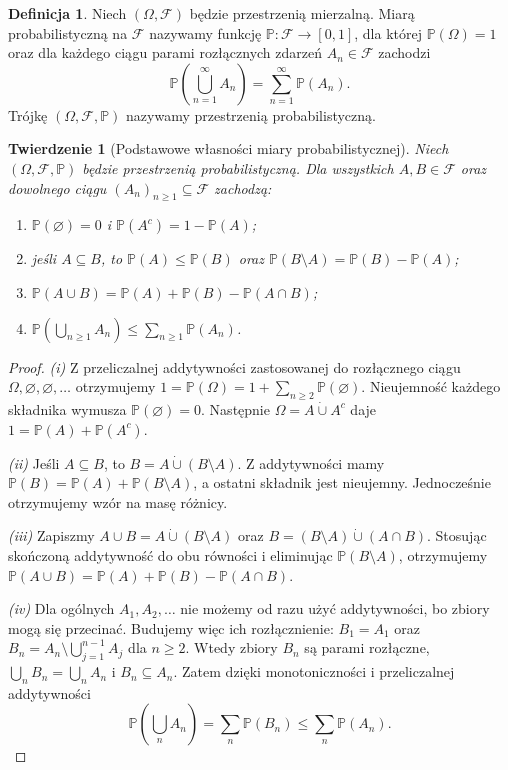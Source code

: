 \documentclass[11pt,a4paper,oneside]{report}
\numberwithin{equation}{chapter}
\theoremstyle{plain}
\newtheorem{twierdzenie}{Twierdzenie}[chapter]
\theoremstyle{definition}
\newtheorem{definicja}{Definicja}[chapter]
\theoremstyle{remark}
\newcommand{\Prob}{\mathbb{P}}
\begin{document}
\begin{definicja}
Niech $(\Omega,\mathcal F)$ będzie przestrzenią mierzalną.
Miarą probabilistyczną na $\mathcal F$ nazywamy funkcję
$\Prob:\mathcal F\to[0,1]$, dla której $\Prob(\Omega)=1$
oraz dla każdego ciągu parami rozłącznych zdarzeń $A_n\in\mathcal F$
zachodzi
\begin{equation}\label{eq:sigma_add}
\Prob\!\left(\bigcup_{n=1}^\infty A_n\right)
=\sum_{n=1}^\infty\Prob(A_n).
\end{equation}
Trójkę $(\Omega,\mathcal F,\Prob)$ nazywamy przestrzenią probabilistyczną.
\end{definicja}

\begin{twierdzenie}[Podstawowe własności miary probabilistycznej]
Niech $(\Omega,\mathcal F,\Prob)$ będzie przestrzenią probabilistyczną.
Dla wszystkich $A,B\in\mathcal F$ oraz dowolnego ciągu
$(A_n)_{n\geq1}\subseteq\mathcal F$ zachodzą:
\begin{enumerate}[label=(\roman*)]
\item $\Prob(\varnothing)=0$ i $\Prob(A^c)=1-\Prob(A)$;
\item jeśli $A\subseteq B$, to $\Prob(A)\leq\Prob(B)$ oraz
      $\Prob(B\setminus A)=\Prob(B)-\Prob(A)$;
\item $\Prob(A\cup B)=\Prob(A)+\Prob(B)-\Prob(A\cap B)$;
\item $\Prob(\bigcup_{n\geq1}A_n)\leq\sum_{n\geq1}\Prob(A_n)$.
\end{enumerate}
\end{twierdzenie}
\begin{proof}
\emph{(i)} Z przeliczalnej addytywności zastosowanej do
rozłącznego ciągu $\Omega,\varnothing,\varnothing,\ldots$
otrzymujemy
$1=\Prob(\Omega)=1+\sum_{n\geq2}\Prob(\varnothing)$.
Nieujemność każdego składnika wymusza
$\Prob(\varnothing)=0$. Następnie
$\Omega=A\mathbin{\dot\cup}A^c$ daje
$1=\Prob(A)+\Prob(A^c)$.

\emph{(ii)} Jeśli $A\subseteq B$, to
$B=A\mathbin{\dot\cup}(B\setminus A)$.
Z addytywności mamy
$\Prob(B)=\Prob(A)+\Prob(B\setminus A)$, a ostatni
składnik jest nieujemny. Jednocześnie otrzymujemy wzór
na masę różnicy.

\emph{(iii)} Zapiszmy
$A\cup B=A\mathbin{\dot\cup}(B\setminus A)$ oraz
$B=(B\setminus A)\mathbin{\dot\cup}(A\cap B)$.
Stosując skończoną addytywność do obu równości i
eliminując $\Prob(B\setminus A)$, otrzymujemy
$\Prob(A\cup B)=\Prob(A)+\Prob(B)-\Prob(A\cap B)$.

\emph{(iv)} Dla ogólnych $A_1,A_2,\ldots$ nie możemy
od razu użyć addytywności, bo zbiory mogą się przecinać.
Budujemy więc ich rozłącznienie: $B_1=A_1$ oraz
$B_n=A_n\setminus\bigcup_{j=1}^{n-1}A_j$ dla $n\geq2$.
Wtedy zbiory $B_n$ są parami rozłączne,
$\bigcup_n B_n=\bigcup_n A_n$ i $B_n\subseteq A_n$.
Zatem dzięki monotoniczności i przeliczalnej addytywności
\[
\Prob\left(\bigcup_n A_n\right)
=\sum_n\Prob(B_n)\leq\sum_n\Prob(A_n).
\]
\end{proof}
\end{document}
